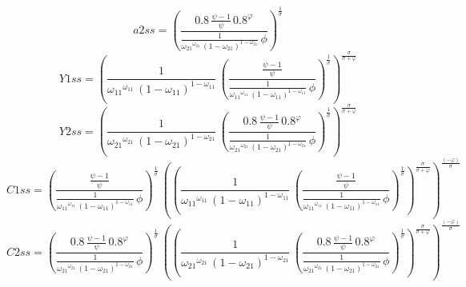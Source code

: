 \begin{dmath*}
a2ss = \left(\frac{0.8\, \frac{{{\psi}}-1}{{{\psi}}}\, 0.8^{{{\varphi}}}}{\frac{1}{{{\omega_{21}}}^{{{\omega_{21}}}}\, \left(1-{{\omega_{21}}}\right)^{1-{{\omega_{21}}}}}\, {{\phi}}}\right)^{\frac{1}{{{\sigma}}}}
\end{dmath*}
\begin{dmath*}
Y1ss = \left(\frac{1}{{{\omega_{11}}}^{{{\omega_{11}}}}\, \left(1-{{\omega_{11}}}\right)^{1-{{\omega_{11}}}}}\, \left(\frac{\frac{{{\psi}}-1}{{{\psi}}}}{\frac{1}{{{\omega_{11}}}^{{{\omega_{11}}}}\, \left(1-{{\omega_{11}}}\right)^{1-{{\omega_{11}}}}}\, {{\phi}}}\right)^{\frac{1}{{{\sigma}}}}\right)^{\frac{{{\sigma}}}{{{\sigma}}+{{\varphi}}}}
\end{dmath*}
\begin{dmath*}
Y2ss = \left(\frac{1}{{{\omega_{21}}}^{{{\omega_{21}}}}\, \left(1-{{\omega_{21}}}\right)^{1-{{\omega_{21}}}}}\, \left(\frac{0.8\, \frac{{{\psi}}-1}{{{\psi}}}\, 0.8^{{{\varphi}}}}{\frac{1}{{{\omega_{21}}}^{{{\omega_{21}}}}\, \left(1-{{\omega_{21}}}\right)^{1-{{\omega_{21}}}}}\, {{\phi}}}\right)^{\frac{1}{{{\sigma}}}}\right)^{\frac{{{\sigma}}}{{{\sigma}}+{{\varphi}}}}
\end{dmath*}
\begin{dmath*}
C1ss = \left(\frac{\frac{{{\psi}}-1}{{{\psi}}}}{\frac{1}{{{\omega_{11}}}^{{{\omega_{11}}}}\, \left(1-{{\omega_{11}}}\right)^{1-{{\omega_{11}}}}}\, {{\phi}}}\right)^{\frac{1}{{{\sigma}}}}\, \left(\left(\frac{1}{{{\omega_{11}}}^{{{\omega_{11}}}}\, \left(1-{{\omega_{11}}}\right)^{1-{{\omega_{11}}}}}\, \left(\frac{\frac{{{\psi}}-1}{{{\psi}}}}{\frac{1}{{{\omega_{11}}}^{{{\omega_{11}}}}\, \left(1-{{\omega_{11}}}\right)^{1-{{\omega_{11}}}}}\, {{\phi}}}\right)^{\frac{1}{{{\sigma}}}}\right)^{\frac{{{\sigma}}}{{{\sigma}}+{{\varphi}}}}\right)^{\frac{\left(-{{\varphi}}\right)}{{{\sigma}}}}
\end{dmath*}
\begin{dmath*}
C2ss = \left(\frac{0.8\, \frac{{{\psi}}-1}{{{\psi}}}\, 0.8^{{{\varphi}}}}{\frac{1}{{{\omega_{21}}}^{{{\omega_{21}}}}\, \left(1-{{\omega_{21}}}\right)^{1-{{\omega_{21}}}}}\, {{\phi}}}\right)^{\frac{1}{{{\sigma}}}}\, \left(\left(\frac{1}{{{\omega_{21}}}^{{{\omega_{21}}}}\, \left(1-{{\omega_{21}}}\right)^{1-{{\omega_{21}}}}}\, \left(\frac{0.8\, \frac{{{\psi}}-1}{{{\psi}}}\, 0.8^{{{\varphi}}}}{\frac{1}{{{\omega_{21}}}^{{{\omega_{21}}}}\, \left(1-{{\omega_{21}}}\right)^{1-{{\omega_{21}}}}}\, {{\phi}}}\right)^{\frac{1}{{{\sigma}}}}\right)^{\frac{{{\sigma}}}{{{\sigma}}+{{\varphi}}}}\right)^{\frac{\left(-{{\varphi}}\right)}{{{\sigma}}}}
\end{dmath*}

